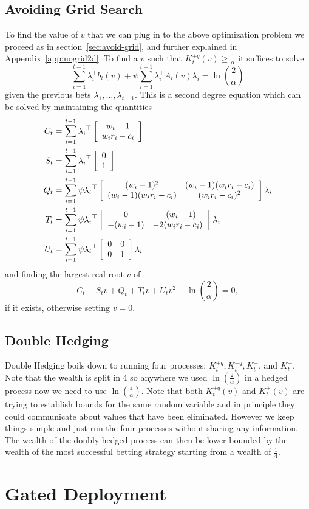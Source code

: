 \subsection{Avoiding Grid Search}
To find the value of $v$ that we can plug in to the above 
optimization problem we proceed as in section~\ref{sec:avoid-grid},
and further explained in Appendix~\ref{app:nogrid2d}.
To find a $v$ such that 
$K_t^{\pm q}(v)\geq \frac{1}{\alpha}$
it suffices to solve
\[
\sum_{i=1}^{t-1} \lambda_i^\top b_i(v) + \psi \sum_{i=1}^{t-1} \lambda_i^\top  A_i(v) \lambda_i = \ln\left(\frac{2}{\alpha}\right) 
\]
given the previous bets $\lambda_1,\ldots, \lambda_{t-1}$. This 
is a second degree equation which can be solved by maintaining 
the quantities
\begin{align*}
C_t&= \sum_{i=1}^{t-1} {\lambda_i}^\top \left[\begin{array}{c} w_i-1 \\ w_i r_i-c_i \end{array}\right] \\
S_t&= \sum_{i=1}^{t-1} {\lambda_i}^\top \left[\begin{array}{c} 0 \\ 1 \end{array}\right] \\
Q_t&= \sum_{i=1}^{t-1} \psi  {\lambda_i}^\top \left[\begin{array}{cc} (w_i-1)^2 & (w_i-1)(w_i r_i-c_i) \\ (w_i-1)(w_i r_i-c_i) & (w_ir_i-c_i)^2 \end{array}\right] \lambda_i \\
T_t&= \sum_{i=1}^{t-1} \psi  {\lambda_i}^\top \left[\begin{array}{cc} 0 & -(w_i-1) \\ -(w_i-1) & -2(w_ir_i-c_i) \end{array}\right] \lambda_i \\
U_t&=  \sum_{i=1}^{t-1} \psi {\lambda_i}^\top \left[\begin{array}{cc} 0 & 0 \\ 0 & 1 \end{array}\right] \lambda_i
\end{align*}
and finding the largest real root $v$ of
\[
C_t - S_t v + Q_t + T_t v + U_t v^2 - \ln\left(\frac{2}{\alpha}\right) = 0,
\]
if it exists, otherwise setting $v=0$.

\subsection{Double Hedging}
Double Hedging boils down to running four processes: 
$K_t^{+q}, K_t^{-q}, K_t^{+}$, and $K_t^{-}$. Note 
that the wealth is split in 4 so anywhere we used 
$\ln\left(\frac{2}{\alpha}\right)$ in a hedged process
now we need to use $\ln\left(\frac{4}{\alpha}\right)$.
Note that both $K_t^{+q}(v)$ and $K_t^{+}(v)$ are trying to 
establish bounds for the same random variable and in principle
they could communicate about values that
have been eliminated. However we keep things simple
and just run the four processes without sharing 
any information. The wealth of the doubly 
hedged process can then be lower bounded by 
the wealth of the most successful betting 
strategy starting from a wealth of $\frac{1}{4}$.

\section{Gated Deployment}
\label{app:gd}
